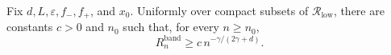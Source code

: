 Fix \(d,L,\varepsilon,f_-,f_+\), and \(x_0\).  Uniformly over compact
subsets of \(\mathcal R_{\mathrm{low}}\), there are constants \(c>0\) and
\(n_0\) such that, for every \(n\geq n_0\),
\[
R_n^{\mathrm{band}}\geq c\,n^{-\gamma/(2\gamma+d)}.
\]